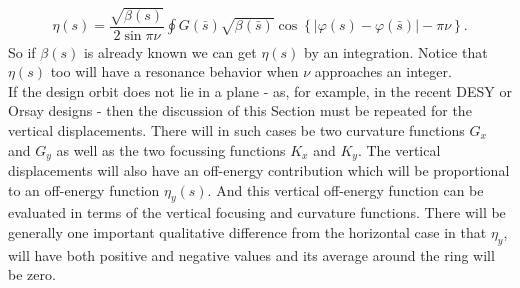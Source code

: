 \begin{align}
	\boxed{ \eta(s) = \dfrac{\sqrt{\beta(s)}}{2\sin\pi\nu}\oint G(\bar{s})\sqrt{\beta(\bar{s})}\cos\left\lbrace |\varphi(s) - \varphi(\bar{s})| - \pi\nu \right\rbrace }.
\end{align}
So if $\beta(s)$ is already known we can get $\eta(s)$ by an integration. Notice that $\eta(s)$ too will have a resonance behavior when $\nu$ approaches an integer.\\
If the design orbit does not lie in a plane - as, for example, in the recent DESY or Orsay designs - then the discussion of this Section must be repeated for the vertical displacements.
 There will in such cases be two curvature functions $G_x$ and $G_y$ as well as the two focussing functions $K_x$ and $K_y$. The vertical displacements will also have an off-energy
 contribution which will be proportional to an off-energy function $\eta_y(s)$. And this vertical
 off-energy function can be evaluated in terms of the vertical focusing and curvature functions.
 There will be generally one important qualitative difference from the horizontal case in that $\eta_y$, will have both positive and negative values and its average around the ring will be zero.
